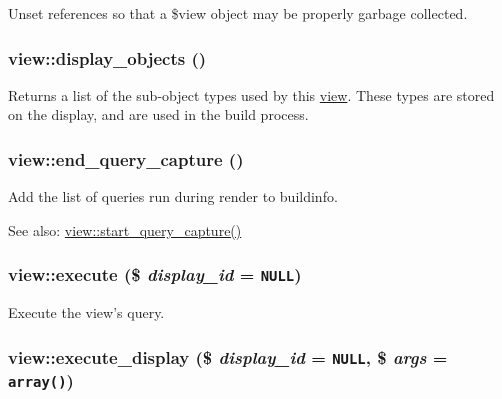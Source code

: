 Unset references so that a \$view object may be properly garbage collected. \hypertarget{classview_1338697759506981e17d1c4772b13aa6}{
\subsubsection[{display\_\-objects}]{\setlength{\rightskip}{0pt plus 5cm}view::display\_\-objects ()}}
\label{classview_1338697759506981e17d1c4772b13aa6}


Returns a list of the sub-object types used by this \hyperlink{classview}{view}. These types are stored on the display, and are used in the build process. \hypertarget{classview_7170a33aff32de00b1ff92ee4483cb88}{
\subsubsection[{end\_\-query\_\-capture}]{\setlength{\rightskip}{0pt plus 5cm}view::end\_\-query\_\-capture ()}}
\label{classview_7170a33aff32de00b1ff92ee4483cb88}


Add the list of queries run during render to buildinfo.

\begin{Desc}
\item[See also:]\hyperlink{classview_1e3efc171324e713e7e130c445dbf84d}{view::start\_\-query\_\-capture()} \end{Desc}
\hypertarget{classview_d33e492cac26ffd816fc9ba9361875d1}{
\subsubsection[{execute}]{\setlength{\rightskip}{0pt plus 5cm}view::execute (\$ {\em display\_\-id} = {\tt NULL})}}
\label{classview_d33e492cac26ffd816fc9ba9361875d1}


Execute the view's query. \hypertarget{classview_6b47b3882f4fea8e53a11c88f147973b}{
\subsubsection[{execute\_\-display}]{\setlength{\rightskip}{0pt plus 5cm}view::execute\_\-display (\$ {\em display\_\-id} = {\tt NULL}, \/  \$ {\em args} = {\tt array()})}}
\label{classview_6b47b3882f4fea8e53a11c88f147973b}


